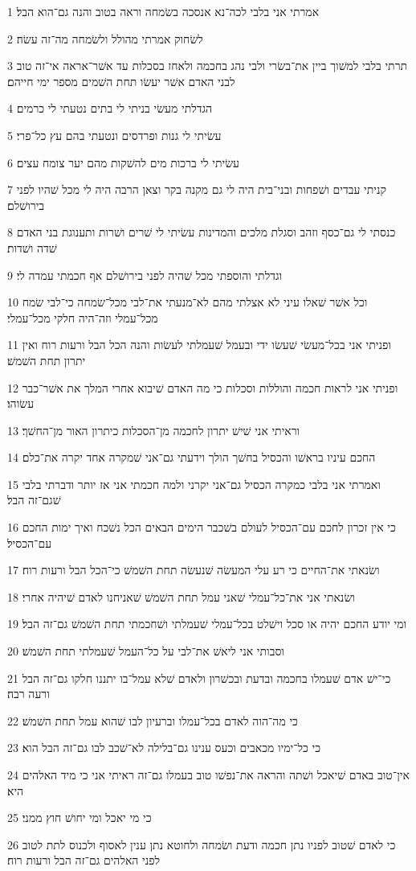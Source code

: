 \par 1 אמרתי אני בלבי לכה־נא אנסכה בשׂמחה וראה בטוב והנה גם־הוא הבל׃
\par 2 לשׂחוק אמרתי מהולל ולשׂמחה מה־זה עשׂה׃
\par 3 תרתי בלבי למשׁוך ביין את־בשׂרי ולבי נהג בחכמה ולאחז בסכלות עד אשׁר־אראה אי־זה טוב לבני האדם אשׁר יעשׂו תחת השׁמים מספר ימי חייהם׃
\par 4 הגדלתי מעשׂי בניתי לי בתים נטעתי לי כרמים׃
\par 5 עשׂיתי לי גנות ופרדסים ונטעתי בהם עץ כל־פרי׃
\par 6 עשׂיתי לי ברכות מים להשׁקות מהם יער צומח עצים׃
\par 7 קניתי עבדים ושׁפחות ובני־בית היה לי גם מקנה בקר וצאן הרבה היה לי מכל שׁהיו לפני בירושׁלם׃
\par 8 כנסתי לי גם־כסף וזהב וסגלת מלכים והמדינות עשׂיתי לי שׁרים ושׁרות ותענוגת בני האדם שׁדה ושׁדות׃
\par 9 וגדלתי והוספתי מכל שׁהיה לפני בירושׁלם אף חכמתי עמדה לי׃
\par 10 וכל אשׁר שׁאלו עיני לא אצלתי מהם לא־מנעתי את־לבי מכל־שׂמחה כי־לבי שׂמח מכל־עמלי וזה־היה חלקי מכל־עמלי׃
\par 11 ופניתי אני בכל־מעשׂי שׁעשׂו ידי ובעמל שׁעמלתי לעשׂות והנה הכל הבל ורעות רוח ואין יתרון תחת השׁמשׁ׃
\par 12 ופניתי אני לראות חכמה והוללות וסכלות כי מה האדם שׁיבוא אחרי המלך את אשׁר־כבר עשׂוהו׃
\par 13 וראיתי אני שׁישׁ יתרון לחכמה מן־הסכלות כיתרון האור מן־החשׁך׃
\par 14 החכם עיניו בראשׁו והכסיל בחשׁך הולך וידעתי גם־אני שׁמקרה אחד יקרה את־כלם׃
\par 15 ואמרתי אני בלבי כמקרה הכסיל גם־אני יקרני ולמה חכמתי אני אז יותר ודברתי בלבי שׁגם־זה הבל׃
\par 16 כי אין זכרון לחכם עם־הכסיל לעולם בשׁכבר הימים הבאים הכל נשׁכח ואיך ימות החכם עם־הכסיל׃
\par 17 ושׂנאתי את־החיים כי רע עלי המעשׂה שׁנעשׂה תחת השׁמשׁ כי־הכל הבל ורעות רוח׃
\par 18 ושׂנאתי אני את־כל־עמלי שׁאני עמל תחת השׁמשׁ שׁאניחנו לאדם שׁיהיה אחרי׃
\par 19 ומי יודע החכם יהיה או סכל וישׁלט בכל־עמלי שׁעמלתי ושׁחכמתי תחת השׁמשׁ גם־זה הבל׃
\par 20 וסבותי אני ליאשׁ את־לבי על כל־העמל שׁעמלתי תחת השׁמשׁ׃
\par 21 כי־ישׁ אדם שׁעמלו בחכמה ובדעת ובכשׁרון ולאדם שׁלא עמל־בו יתננו חלקו גם־זה הבל ורעה רבה׃
\par 22 כי מה־הוה לאדם בכל־עמלו וברעיון לבו שׁהוא עמל תחת השׁמשׁ׃
\par 23 כי כל־ימיו מכאבים וכעס ענינו גם־בלילה לא־שׁכב לבו גם־זה הבל הוא׃
\par 24 אין־טוב באדם שׁיאכל ושׁתה והראה את־נפשׁו טוב בעמלו גם־זה ראיתי אני כי מיד האלהים היא׃
\par 25 כי מי יאכל ומי יחושׁ חוץ ממני׃
\par 26 כי לאדם שׁטוב לפניו נתן חכמה ודעת ושׂמחה ולחוטא נתן ענין לאסוף ולכנוס לתת לטוב לפני האלהים גם־זה הבל ורעות רוח׃

